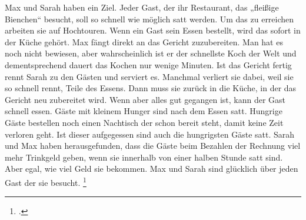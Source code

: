 \documentclass{bschlangaul-aufgabe}
\begin{document}

Max und Sarah haben ein Ziel. Jeder Gast, der ihr Restaurant, das
„fleißige Bienchen“ besucht, soll so schnell wie möglich satt werden. Um
das zu erreichen arbeiten sie auf Hochtouren. Wenn ein Gast sein Essen
bestellt, wird das sofort in der Küche gehört. Max fängt direkt an das
Gericht zuzubereiten. Man hat es noch nicht bewiesen, aber
wahrscheinlich ist er der schnellste Koch der Welt und dementsprechend
dauert das Kochen nur wenige Minuten. Ist das Gericht fertig rennt Sarah
zu den Gästen und serviert es. Manchmal verliert sie dabei, weil sie so
schnell rennt, Teile des Essens. Dann muss sie zurück in die Küche, in
der das Gericht neu zubereitet wird. Wenn aber alles gut gegangen ist,
kann der Gast schnell essen. Gäste mit kleinem Hunger sind nach dem
Essen satt. Hungrige Gäste bestellen noch einen Nachtisch der schon
bereit steht, damit keine Zeit verloren geht. Ist dieser aufgegessen
sind auch die hungrigsten Gäste satt. Sarah und Max haben
herausgefunden, dass die Gäste beim Bezahlen der Rechnung viel mehr
Trinkgeld geben, wenn sie innerhalb von einer halben Stunde satt sind.
Aber egal, wie viel Geld sie bekommen. Max und Sarah sind glücklich über
jeden Gast der sie besucht.
\footcite{net:pdf:wikiversity:zustandsdiagramm}

\end{document}
